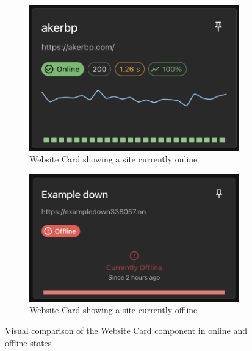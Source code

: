 \begin{figure}[H]
    \centering
    \begin{subfigure}[b]{0.45\textwidth}
        \centering
        \includegraphics[width=\textwidth]{figures/websiteCard.png}
        \caption{Website Card showing a site currently online}
        \label{fig:websitecard-component}
    \end{subfigure}
    \hfill
    \begin{subfigure}[b]{0.45\textwidth}
        \centering
        \includegraphics[width=\textwidth]{figures/websitecard_down.png}
        \caption{Website Card showing a site currently offline}
        \label{fig:websitecard-component-down}
    \end{subfigure}
    \caption{Visual comparison of the Website Card component in online and offline states}
    \label{fig:websitecard-comparison}
\end{figure}



